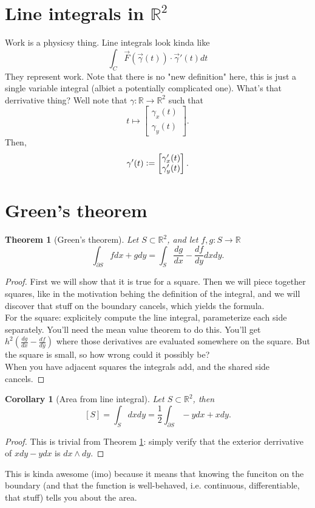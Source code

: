 \documentclass{article}[11pt]
\newcommand{\defeq}{\vcentcolon=}
\newtheorem{corollary}{Corollary}
\newtheorem{theorem}{Theorem}
\begin{document}
\section{Line integrals in $\mathbb{R}^2$}
Work is a physicsy thing. 
Line integrals look kinda like
$$\int_C \vec{F}(\vec{\gamma}(t))\cdot \vec{\gamma}'(t) dt$$
They represent work.
Note that there is no "new definition" here, this is just a single variable integral (albiet a potentially complicated one).
What's that derrivative thing?
Well note that $\gamma : \mathbb{R} \to \mathbb{R}^2$ such that 
$$t \mapsto \begin{bmatrix} \gamma_x(t) \\ \gamma_y(t) \end{bmatrix}.$$
Then,
$$\gamma'(t) \defeq \begin{bmatrix} \gamma_x'(t) \\ \gamma_y'(t) \end{bmatrix}.$$


\section{Green's theorem}
\begin{theorem}[Green's theorem]
	\label{thm:green}
	Let $S\subset \mathbb{R}^2$, and let $f, g : S \to \mathbb{R}$
	$$\int_{\partial S} f dx + g dy = \int_{S} \frac{dg}{dx} - \frac{df}{dy} dx dy.$$
\end{theorem}

\begin{proof}
	First we will show that it is true for a square. Then we will piece together squares, like in the motivation behing the definition of the integral, and we will discover that stuff on the boundary cancels, which yields the formula.\\
	For the square: explicitely compute the line integral, parameterize each side separately. You'll need the mean value theorem to do this. You'll get $h^2(\frac{dg}{dx} - \frac{df}{dy})$ where those derivatives are evaluated somewhere on the square. But the square is small, so how wrong could it possibly be?\\
	When you have adjacent squares the integrals add, and the shared side cancels.
\end{proof}

\begin{corollary}[Area from line integral]
Let $S\subset \mathbb{R}^2$, then 
$$[S] = \int_S dx dy = \frac{1}{2}\int_{\partial S} -ydx + xdy.$$
\end{corollary}
\begin{proof}
	This is trivial from Theorem \ref{thm:green}: simply verify that the exterior derrivative of $xdy-ydx$ is $dx \wedge dy$.
\end{proof}
This is kinda awesome (imo) because it means that knowing the funciton on the boundary (and that the function is well-behaved, i.e. continuous, differentiable, that stuff) tells you about the area.
\end{document}
